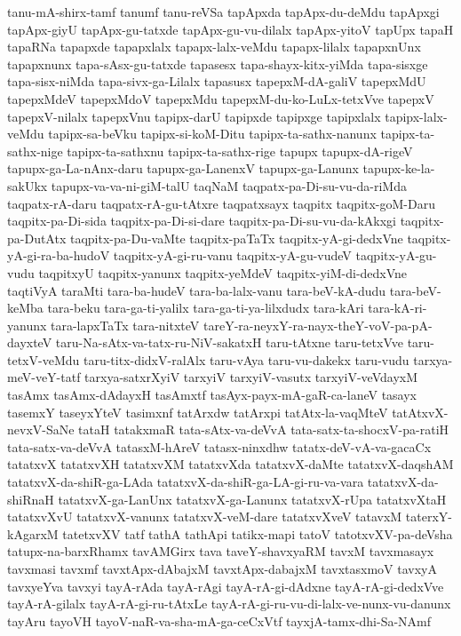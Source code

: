 {tanu-mA-shirx-tamf
tanumf
tanu-reVSa
tapApxda
tapApx-du-deMdu
tapApxgi
tapApx-giyU
tapApx-gu-tatxde
tapApx-gu-vu-dilalx
tapApx-yitoV
tapUpx
tapaH
tapaRNa
tapapxde
tapapxlalx
tapapx-lalx-veMdu
tapapx-lilalx
tapapxnUnx
tapapxnunx
tapa-sAsx-gu-tatxde
tapasesx
tapa-shayx-kitx-yiMda
tapa-sisxge
tapa-sisx-niMda
tapa-sivx-ga-Lilalx
tapasusx
tapepxM-dA-galiV
tapepxMdU
tapepxMdeV
tapepxMdoV
tapepxMdu
tapepxM-du-ko-LuLx-tetxVve
tapepxV
tapepxV-nilalx
tapepxVnu
tapipx-darU
tapipxde
tapipxge
tapipxlalx
tapipx-lalx-veMdu
tapipx-sa-beVku
tapipx-si-koM-Ditu
tapipx-ta-sathx-nanunx
tapipx-ta-sathx-nige
tapipx-ta-sathxnu
tapipx-ta-sathx-rige
tapupx
tapupx-dA-rigeV
tapupx-ga-La-nAnx-daru
tapupx-ga-LanenxV
tapupx-ga-Lanunx
tapupx-ke-la-sakUkx
tapupx-va-va-ni-giM-talU
taqNaM
taqpatx-pa-Di-su-vu-da-riMda
taqpatx-rA-daru
taqpatx-rA-gu-tAtxre
taqpatxsayx
taqpitx
taqpitx-goM-Daru
taqpitx-pa-Di-sida
taqpitx-pa-Di-si-dare
taqpitx-pa-Di-su-vu-da-kAkxgi
taqpitx-pa-DutAtx
taqpitx-pa-Du-vaMte
taqpitx-paTaTx
taqpitx-yA-gi-dedxVne
taqpitx-yA-gi-ra-ba-hudoV
taqpitx-yA-gi-ru-vanu
taqpitx-yA-gu-vudeV
taqpitx-yA-gu-vudu
taqpitxyU
taqpitx-yanunx
taqpitx-yeMdeV
taqpitx-yiM-di-dedxVne
taqtiVyA
taraMti
tara-ba-hudeV
tara-ba-lalx-vanu
tara-beV-kA-dudu
tara-beV-keMba
tara-beku
tara-ga-ti-yalilx
tara-ga-ti-ya-lilxdudx
tara-kAri
tara-kA-ri-yanunx
tara-lapxTaTx
tara-nitxteV
tareY-ra-neyxY-ra-nayx-theY-voV-pa-pA-dayxteV
taru-Na-sAtx-va-tatx-ru-NiV-sakatxH
taru-tAtxne
taru-tetxVve
taru-tetxV-veMdu
taru-titx-didxV-ralAlx
taru-vAya
taru-vu-dakekx
taru-vudu
tarxya-meV-veY-tatf
tarxya-satxrXyiV
tarxyiV
tarxyiV-vasutx
tarxyiV-veVdayxM
tasAmx
tasAmx-dAdayxH
tasAmxtf
tasAyx-payx-mA-gaR-ca-laneV
tasayx
tasemxY
taseyxYteV
tasimxnf
tatArxdw
tatArxpi
tatAtx-la-vaqMteV
tatAtxvX-nevxV-SaNe
tataH
tatakxmaR
tata-sAtx-va-deVvA
tata-satx-ta-shocxV-pa-ratiH
tata-satx-va-deVvA
tatasxM-hAreV
tatasx-ninxdhw
tatatx-deV-vA-va-gacaCx
tatatxvX
tatatxvXH
tatatxvXM
tatatxvXda
tatatxvX-daMte
tatatxvX-daqshAM
tatatxvX-da-shiR-ga-LAda
tatatxvX-da-shiR-ga-LA-gi-ru-va-vara
tatatxvX-da-shiRnaH
tatatxvX-ga-LanUnx
tatatxvX-ga-Lanunx
tatatxvX-rUpa
tatatxvXtaH
tatatxvXvU
tatatxvX-vanunx
tatatxvX-veM-dare
tatatxvXveV
tatavxM
taterxY-kAgarxM
tatetxvXV
tatf
tathA
tathApi
tatikx-mapi
tatoV
tatotxvXV-pa-deVsha
tatupx-na-barxRhamx
tavAMGirx
tava
taveY-shavxyaRM
tavxM
tavxmasayx
tavxmasi
tavxmf
tavxtApx-dAbajxM
tavxtApx-dabajxM
tavxtasxmoV
tavxyA
tavxyeYva
tavxyi
tayA-rAda
tayA-rAgi
tayA-rA-gi-dAdxne
tayA-rA-gi-dedxVve
tayA-rA-gilalx
tayA-rA-gi-ru-tAtxLe
tayA-rA-gi-ru-vu-di-lalx-ve-nunx-vu-danunx
tayAru
tayoVH
tayoV-naR-va-sha-mA-ga-ceCxVtf
tayxjA-tamx-dhi-Sa-NAmf
}
